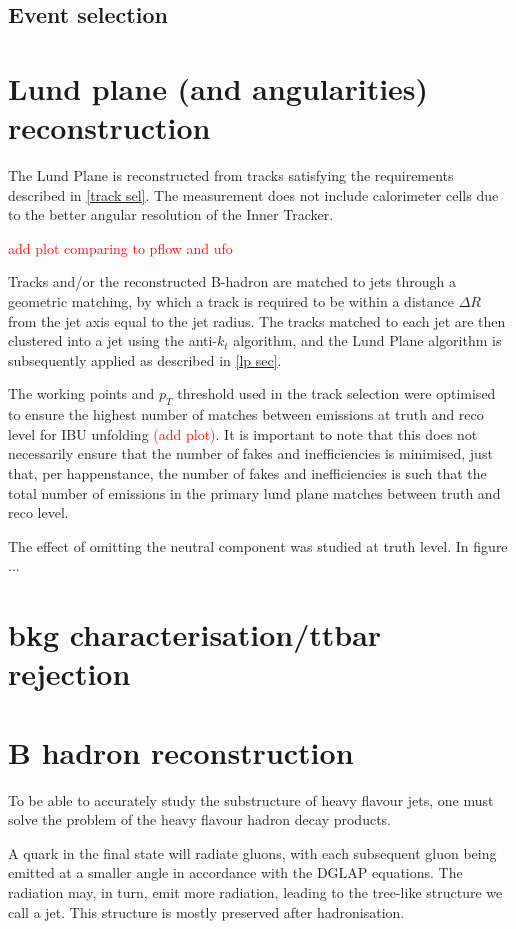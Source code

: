 \documentclass[10pt,a4paper]{book}
\newcommand{\todo}[1]{{\textcolor{red}{#1}}}
\begin{document}
\subsection{Event selection}

\section{Lund plane (and angularities) reconstruction}

The Lund Plane is reconstructed from tracks satisfying the requirements described in \ref{track sel}. The measurement does not include calorimeter cells due to the better angular resolution of the Inner Tracker. 

\todo{add plot comparing to pflow and ufo}

Tracks and/or the reconstructed B-hadron are matched to jets through a geometric matching, by which a track is required to be within a distance $\Delta R$ from the jet axis equal to the jet radius. The tracks matched to each jet are then clustered into a jet using the anti-$k_t$ algorithm, and the Lund Plane algorithm is subsequently applied as described in \ref{lp sec}.

The working points and $p_T$ threshold used in the track selection were optimised to ensure the highest number of matches between emissions at truth and reco level for IBU unfolding \todo{(add plot)}. It is important to note that this does not necessarily ensure that the number of fakes and inefficiencies is minimised, just that, per happenstance, the number of fakes and inefficiencies is such that the total number of emissions in the primary lund plane matches between truth and reco level.


The effect of omitting the neutral component was studied at truth level. In figure ...

\section{bkg characterisation/ttbar rejection}

\section{B hadron reconstruction}
To be able to accurately study the substructure of heavy flavour jets, one must solve the problem of the heavy flavour hadron decay products. 

A quark in the final state will radiate gluons, with each subsequent gluon being emitted at a smaller angle in accordance with the DGLAP equations. The radiation may, in turn, emit more radiation, leading to the tree-like structure we call a jet. This structure is mostly preserved after hadronisation.
\end{document}
